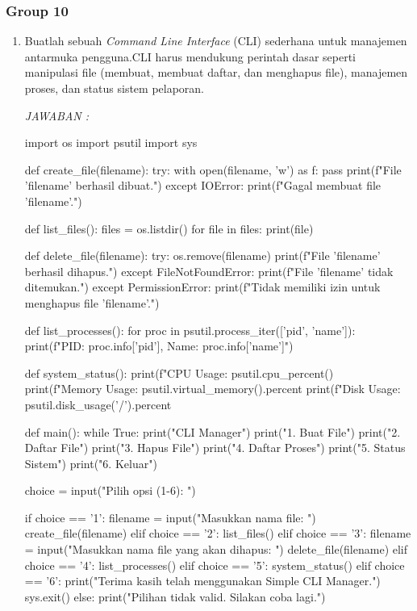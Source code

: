 \documentclass[12pt]{article}
\begin{document}
\subsubsection{Group 10}
\begin{enumerate}
    \item Buatlah sebuah \textit{Command Line Interface} (CLI) sederhana untuk manajemen antarmuka pengguna.CLI harus mendukung perintah dasar seperti manipulasi file (membuat, membuat daftar, dan menghapus file), manajemen proses, dan status sistem pelaporan.

    \textit{JAWABAN :}
    \begin{python}
        import os
import psutil
import sys

def create_file(filename):
    try:
        with open(filename, 'w') as f:
            pass
        print(f"File '{filename}' berhasil dibuat.")
    except IOError:
        print(f"Gagal membuat file '{filename}'.")

def list_files():
    files = os.listdir()
    for file in files:
        print(file)

def delete_file(filename):
    try:
        os.remove(filename)
        print(f"File '{filename}' berhasil dihapus.")
    except FileNotFoundError:
        print(f"File '{filename}' tidak ditemukan.")
    except PermissionError:
        print(f"Tidak memiliki izin untuk menghapus file '{filename}'.")

def list_processes():
    for proc in psutil.process_iter(['pid', 'name']):
        print(f"PID: {proc.info['pid']}, Name: {proc.info['name']}")

def system_status():
    print(f"CPU Usage: {psutil.cpu_percent()}%
    print(f"Memory Usage: {psutil.virtual_memory().percent}%
    print(f"Disk Usage: {psutil.disk_usage('/').percent}%

def main():
    while True:
        print("\nSimple CLI Manager")
        print("1. Buat File")
        print("2. Daftar File")
        print("3. Hapus File")
        print("4. Daftar Proses")
        print("5. Status Sistem")
        print("6. Keluar")
        
        choice = input("Pilih opsi (1-6): ")
        
        if choice == '1':
            filename = input("Masukkan nama file: ")
            create_file(filename)
        elif choice == '2':
            list_files()
        elif choice == '3':
            filename = input("Masukkan nama file yang akan dihapus: ")
            delete_file(filename)
        elif choice == '4':
            list_processes()
        elif choice == '5':
            system_status()
        elif choice == '6':
            print("Terima kasih telah menggunakan Simple CLI Manager.")
            sys.exit()
        else:
            print("Pilihan tidak valid. Silakan coba lagi.")


\end{python}
\end{enumerate}
\end{document}

